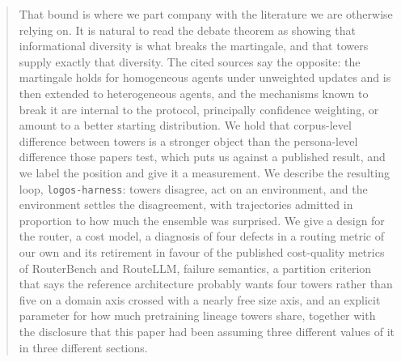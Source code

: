\documentclass[11pt]{article}
\begin{document}
\begin{abstract}
That bound is where we part company with the literature we are otherwise relying on. It is natural to read the debate theorem as showing that informational diversity is what breaks the martingale, and that towers supply exactly that diversity. The cited sources say the opposite: the martingale holds for homogeneous agents under unweighted updates and is then extended to heterogeneous agents, and the mechanisms known to break it are internal to the protocol, principally confidence weighting, or amount to a better starting distribution. We hold that corpus-level difference between towers is a stronger object than the persona-level difference those papers test, which puts us against a published result, and we label the position and give it a measurement. We describe the resulting loop, \texttt{logos-harness}: towers disagree, act on an environment, and the environment settles the disagreement, with trajectories admitted in proportion to how much the ensemble was surprised. We give a design for the router, a cost model, a diagnosis of four defects in a routing metric of our own and its retirement in favour of the published cost-quality metrics of RouterBench and RouteLLM, failure semantics, a partition criterion that says the reference architecture probably wants four towers rather than five on a domain axis crossed with a nearly free size axis, and an explicit parameter for how much pretraining lineage towers share, together with the disclosure that this paper had been assuming three different values of it in three different sections.


\end{abstract}
\end{document}
